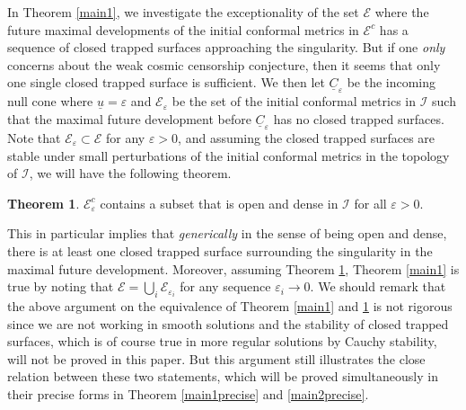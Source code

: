 \documentclass[11pt,reqno]{amsart}
\theoremstyle{definition}
\newtheorem{theorem}{Theorem}[section]
\newtheorem{remark}{Remark}[section]
\numberwithin{equation}{section}
\def\ub{\underline{u}}
\def\Cb{\underline{C}}
\begin{document}
In Theorem \ref{main1}, we investigate the exceptionality of the set $\mathcal{E}$ where the future maximal developments of the initial conformal metrics in $\mathcal{E}^c$ has a sequence of closed trapped surfaces approaching the singularity. But if one \emph{only} concerns about the weak cosmic censorship conjecture, then it seems that only one single closed trapped surface is sufficient. We then let $\Cb_\varepsilon$ be the incoming null cone where $\ub=\varepsilon$ and $\mathcal{E}_\varepsilon$ be the set of the initial conformal metrics in $\mathcal{I}$ such that the maximal future development before $\Cb_\varepsilon$ has no closed trapped surfaces. Note that $\mathcal{E}_\varepsilon\subset\mathcal{E}$ for any $\varepsilon>0$, and assuming the closed trapped surfaces are stable under small perturbations of the initial conformal metrics in the topology of $\mathcal{I}$, we will have the following theorem.
\begin{theorem}\label{main2}
$\mathcal{E}_\varepsilon^c$ contains a subset that is open and dense in $\mathcal{I}$ for all $\varepsilon>0$. 
\end{theorem}
This in particular implies that \emph{generically} in the sense of being open and dense, there is at least one closed trapped surface surrounding the singularity in the maximal future development. Moreover, assuming Theorem \ref{main2}, Theorem \ref{main1} is true by noting that $\mathcal{E}=\bigcup_{i}\mathcal{E}_{\varepsilon_i}$ for any sequence $\varepsilon_i\to0$. We should remark that the above argument on the equivalence of Theorem \ref{main1} and \ref{main2} is not rigorous since we are not working in smooth solutions and the stability of closed trapped surfaces, which is of course true in more regular solutions by Cauchy stability, will not be proved in this paper. But this argument still illustrates the close relation between these two statements, which will be proved simultaneously in their precise forms in Theorem \ref{main1precise} and \ref{main2precise}.

\begin{comment}
Finally, in the context of Conjecture \ref{conjecture}, the theorem we have proved can be stated as
\begin{theorem}
For the Einstein equations coupled with a massless scalar field, and let $\mathcal{P}$ be the causal past of a spherical singularity, the conclusion of Conjecture \ref{conjecture} is true.
\end{theorem}
\begin{remark}
Strictly speaking we have not proved Conjecture \ref{conjecture} in any sense because there is no reason to expect that spherical singularities will form from generic initial data. We simply confirm the picture of Conjecture \ref{conjecture} when $\mathcal{P}$ is of some specific type.
\end{remark}
\end{comment}
\end{document}
